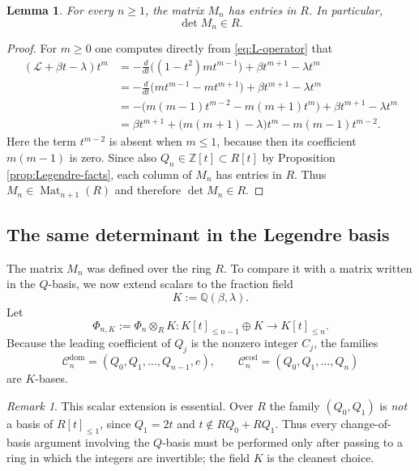 \documentclass[11pt,letterpaper]{amsart}
\numberwithin{equation}{section}
\theoremstyle{plain}
\newtheorem{lemma}[theorem]{Lemma}
\theoremstyle{remark}
\newtheorem{remark}[theorem]{Remark}
\newcommand{\Z}{\mathbb{Z}}
\newcommand{\Q}{\mathbb{Q}}
\begin{document}
\begin{lemma}\label{lem:M-integral}
For every $n\ge 1$, the matrix $M_n$ has entries in $R$. In particular,
\[
 \det M_n\in R.
\]
\end{lemma}

\begin{proof}
For $m\ge 0$ one computes directly from \eqref{eq:L-operator} that
\begin{align*}
 (\mathcal L+\beta t-\lambda)t^m
 &= -\frac{d}{dt}\bigl((1-t^2)mt^{m-1}\bigr)+\beta t^{m+1}-\lambda t^m \\
 &= -\frac{d}{dt}\bigl(mt^{m-1}-mt^{m+1}\bigr)+\beta t^{m+1}-\lambda t^m \\
 &= -\bigl(m(m-1)t^{m-2}-m(m+1)t^m\bigr)+\beta t^{m+1}-\lambda t^m \\
 &= \beta t^{m+1}+\bigl(m(m+1)-\lambda\bigr)t^m-m(m-1)t^{m-2}.
\end{align*}
Here the term $t^{m-2}$ is absent when $m\le 1$, because then its coefficient $m(m-1)$ is zero. Since also $Q_n\in \Z[t]\subset R[t]$ by Proposition \ref{prop:Legendre-facts}, each column of $M_n$ has entries in $R$. Thus $M_n\in \operatorname{Mat}_{n+1}(R)$ and therefore $\det M_n\in R$.
\end{proof}

\subsection{The same determinant in the Legendre basis}

The matrix $M_n$ was defined over the ring $R$. To compare it with a matrix written in the $Q$-basis, we now extend scalars to the fraction field
\[
 K:=\Q(\beta,\lambda).
\]
Let
\[
 \Phi_{n,K}:=\Phi_n\otimes_R K:
 K[t]_{\le n-1}\oplus K\longrightarrow K[t]_{\le n}.
\]
Because the leading coefficient of $Q_j$ is the nonzero integer $C_j$, the families
\[
 \mathcal C_n^{\mathrm{dom}}=(Q_0,Q_1,\dots,Q_{n-1},e),
 \qquad
 \mathcal C_n^{\mathrm{cod}}=(Q_0,Q_1,\dots,Q_n)
\]
are $K$-bases.

\begin{remark}\label{rem:scalar-extension}
This scalar extension is essential. Over $R$ the family $(Q_0,Q_1)$ is \emph{not} a basis of $R[t]_{\le 1}$, since $Q_1=2t$ and $t\notin RQ_0+RQ_1$. Thus every change-of-basis argument involving the $Q$-basis must be performed only after passing to a ring in which the integers are invertible; the field $K$ is the cleanest choice.
\end{remark}
\end{document}
